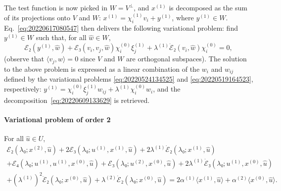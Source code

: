 \documentclass[12pt, final]{scrartcl}
\theoremstyle{definition}
\newcommand{\E}{\mathcal E}
\newcommand{\order}[2][1]{#2^{(#1)}}
\begin{document}
The test function is now picked in $W = V^\perp$, and $\order[1]x$ is
decomposed as the sum of its projections onto $V$ and $W$:
$\order[1]x = \order[1]{χ_i} v_i + \order[1]{y}$, where $\order[1]y \in
W$. Eq.~\eqref{eq:20220617080547} then delivers the following variational
problem: find $\order[1]y \in W$ such that, for all $\hat{w} \in W$,
\begin{equation}
  \E₂(\order[1]y, \hat{w}) + \E₃(v_i, v_j, \hat{w}) \order[0]{χ_i} \order[1]{ξ_j} + \order[1]\lambda \dot{\E}₂(v_i, \hat{w}) \order[0]{χ_i} = 0,
\end{equation}
(observe that $〈 v_j, \hat{w} 〉 = 0$ since $V$ and $W$ are orthogonal
subspaces). The solution to the above problem is expressed as a linear
combination of the $w_i$ and $w_{ij}$ defined by the variational problems
\eqref{eq:20220524134525} and \eqref{eq:20220519164523}, respectively:
$\order[1]y = \order[0]{χ_i} \order[1]{ξ_j} w_{i j} + \order[1]\lambda \order[0]{χ_i}
w_i$, and the decomposition~\eqref{eq:20220609133629} is retrieved.

\paragraph{Variational problem of order 2} For all $\hat{u} \in U$,
\begin{multline*}
    \E₂(\lambda₀; \order[2]x, \hat{u})
    + 2\E₃(\lambda₀; \order[1]u, \order[1]x, \hat{u})
    + 2 \order[1]\lambda \dot{\E}₂(\lambda₀; \order[1]x, \hat{u})\\
    + \E₄(\lambda₀; \order[1]u, \order[1]u, \order[0]x, \hat{u})
    + \E₃(\lambda₀; \order[2]u, \order[0]x, \hat{u})
    + 2\order[1]\lambda \dot{\E}₃(\lambda₀; \order[1]u, \order[0]x, \hat{u})\\
    + ( \order[1]\lambda )^2 \ddot{\E}₂(\lambda₀; \order[0]x, \hat{u})
    + \order[2]\lambda \dot{\E}₂(\lambda₀; \order[0]x, \hat{u})
    = 2 \order[1]α 〈 \order[1]x, \hat{u} 〉
    + \order[2]α 〈 \order[0]x, \hat{u} 〉.
\end{multline*}
\end{document}
